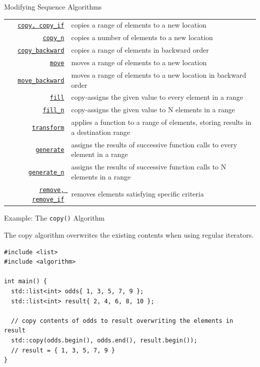 \documentclass[14pt,aspectratio=1610]{beamer}
\begin{document}
\begin{frame}{Modifying Sequence Algorithms}
\footnotesize\renewcommand{\ULdepth}{3pt}\renewcommand{\arraystretch}{1.3}
\begin{tabularx}{\textwidth}{r X}
\href{https://en.cppreference.com/w/cpp/algorithm/copy}{\lstinline{copy, copy_if}} &
  copies a range of elements to a new location\\
\href{https://en.cppreference.com/w/cpp/algorithm/copy_n}{\lstinline{copy_n}} &
  copies a number of elements to a new location\\
\href{https://en.cppreference.com/w/cpp/algorithm/copy_backward}{\lstinline{copy_backward}} &
  copies a range of elements in backward order\\
\href{https://en.cppreference.com/w/cpp/algorithm/move}{\lstinline{move}} &
  moves a range of elements to a new location\\
\href{https://en.cppreference.com/w/cpp/algorithm/move_backward}{\lstinline{move_backward}} &
  moves a range of elements to a new location in backward order\\
\href{https://en.cppreference.com/w/cpp/algorithm/fill}{\lstinline{fill}} &
  copy-assigns the given value to every element in a range\\
\href{https://en.cppreference.com/w/cpp/algorithm/fill_n}{\lstinline{fill_n}} &
  copy-assigns the given value to N elements in a range\\
\href{https://en.cppreference.com/w/cpp/algorithm/transform}{\lstinline{transform}} &
  applies a function to a range of elements, storing results in a destination range\\
\href{https://en.cppreference.com/w/cpp/algorithm/generate}{\lstinline{generate}} &
  assigns the results of successive function calls to every element in a range\\
\href{https://en.cppreference.com/w/cpp/algorithm/generate_n}{\lstinline{generate_n}} &
  assigns the results of successive function calls to N elements in a range\\
\href{https://en.cppreference.com/w/cpp/algorithm/remove}{\lstinline{remove, remove_if}} &
  removes elements satisfying specific criteria\\

\end{tabularx}
\end{frame}

\begin{frame}[fragile]{Example: The \texttt{copy()} Algorithm}

The copy algorithm overwrites the existing contents when using regular iterators.

\begin{lstlisting}[basicstyle=\small\ttfamily]
#include <list>
#include <algorithm>

int main() {
  std::list<int> odds{ 1, 3, 5, 7, 9 };
  std::list<int> result{ 2, 4, 6, 8, 10 };

  // copy contents of odds to result overwriting the elements in result
  std::copy(odds.begin(), odds.end(), result.begin());
  // result = { 1, 3, 5, 7, 9 }
}
\end{lstlisting}
\end{frame}
\end{document}
